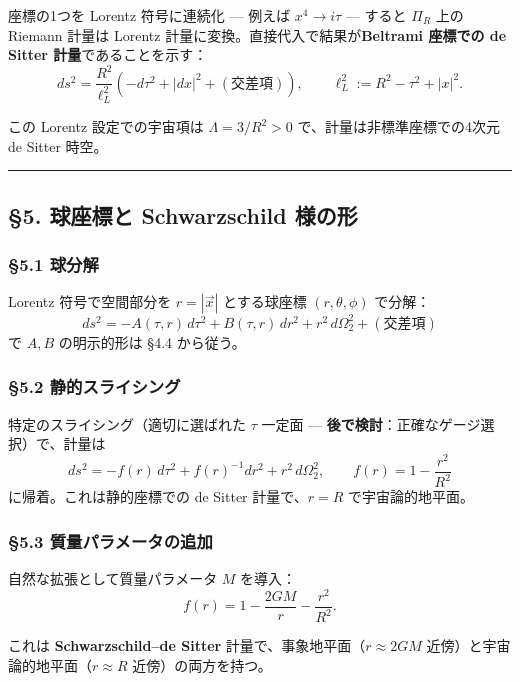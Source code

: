 \documentclass[a4paper,11pt]{ltjsarticle}
\theoremstyle{definition}
\begin{document}
座標の1つを Lorentz 符号に連続化 --- 例えば \(x^4 \to i\tau\) --- すると
\(\Pi_R\) 上の Riemann 計量は Lorentz
計量に変換。直接代入で結果が\textbf{Beltrami 座標での de Sitter
計量}であることを示す：
\[ds^2 = \frac{R^2}{\ell_L^2}\left(-d\tau^2 + |dx|^2 + (\text{交差項})\right), \qquad \ell_L^2 := R^2 - \tau^2 + |x|^2.\]

この Lorentz 設定での宇宙項は \(\Lambda = 3/R^2 > 0\)
で、計量は非標準座標での4次元 de Sitter 時空。

\begin{center}\rule{0.5\linewidth}{0.5pt}\end{center}

\subsection{§5. 球座標と Schwarzschild
様の形}\label{ux7403ux5ea7ux6a19ux3068-schwarzschild-ux69d8ux306eux5f62}

\subsubsection{§5.1 球分解}\label{ux7403ux5206ux89e3}

Lorentz 符号で空間部分を \(r = |\vec{x}|\) とする球座標
\((r, \theta, \phi)\) で分解：
\[ds^2 = -A(\tau, r)\, d\tau^2 + B(\tau, r)\, dr^2 + r^2\, d\Omega_2^2 + (\text{交差項})\]
で \(A, B\) の明示的形は §4.4 から従う。

\subsubsection{§5.2
静的スライシング}\label{ux9759ux7684ux30b9ux30e9ux30a4ux30b7ux30f3ux30b0}

特定のスライシング（適切に選ばれた \(\tau\) 一定面 ---
\textbf{後で検討}：正確なゲージ選択）で、計量は
\[ds^2 = -f(r)\, d\tau^2 + f(r)^{-1} dr^2 + r^2\, d\Omega_2^2, \qquad f(r) = 1 - \frac{r^2}{R^2}\]
に帰着。これは静的座標での de Sitter 計量で、\(r = R\)
で宇宙論的地平面。

\subsubsection{§5.3
質量パラメータの追加}\label{ux8ceaux91cfux30d1ux30e9ux30e1ux30fcux30bfux306eux8ffdux52a0}

自然な拡張として質量パラメータ \(M\) を導入：
\[f(r) = 1 - \frac{2GM}{r} - \frac{r^2}{R^2}.\]

これは \textbf{Schwarzschild--de Sitter}
計量で、事象地平面（\(r \approx 2GM\)
近傍）と宇宙論的地平面（\(r \approx R\) 近傍）の両方を持つ。
\end{document}
